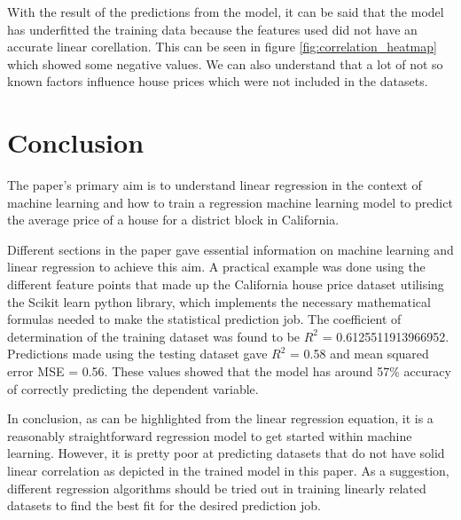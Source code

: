\documentclass[conference]{IEEEtran}
\begin{document}
With the result of the predictions from the model, it can be said that the model has underfitted the training data because the features used did not have an accurate linear corellation. This can be seen in figure \ref{fig:correlation_heatmap} which showed some negative values. We can also understand that a lot of not so known factors influence house prices which were not included in the datasets.


\section{Conclusion}
The paper's primary aim is to understand linear regression in the context of machine learning and how to train a regression machine learning model to predict the average price of a house for a district block in California.

Different sections in the paper gave essential information on machine learning and linear regression to achieve this aim. A practical example was done using the different feature points that made up the California house price dataset utilising the Scikit learn python library, which implements the necessary mathematical formulas needed to make the statistical prediction job. The coefficient of determination of the training dataset was found to be $R^2$ = 0.6125511913966952. Predictions made  using the testing dataset gave $R^2$ = 0.58 and mean squared error MSE = 0.56. These values showed that the model has around 57\% accuracy of correctly predicting the dependent variable.

In conclusion, as can be highlighted from the linear regression equation, it is a reasonably straightforward regression model to get started within machine learning. However, it is pretty poor at predicting datasets that do not have solid linear correlation as depicted in the trained model in this paper. As a suggestion, different regression algorithms should be tried out in training linearly related datasets to find the best fit for the desired prediction job.



\end{document}
